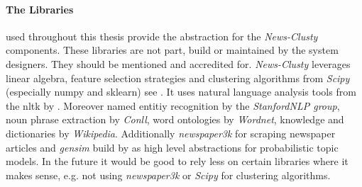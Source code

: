   \paragraph{The Libraries} used throughout this thesis provide the abstraction for the \emph{News-Clusty} components. These libraries are not part, build or maintained by the system designers. They should be mentioned and accredited for. \emph{News-Clusty} leverages linear algebra, feature selection strategies and clustering algorithms from \emph{Scipy} (especially numpy and sklearn) see \cite{ScikitLearn}. It uses natural language analysis tools from the nltk by \cite{NltkPython}. Moreover named entitiy recognition by the \emph{StanfordNLP group}, noun phrase extraction by \emph{Conll}, word ontologies by \emph{Wordnet}, knowledge and dictionaries by \emph{Wikipedia}. Additionally \emph{newspaper3k} for scraping newspaper articles and \emph{gensim} build by \cite{gensim2010} as high level abstractions for probabilistic topic models. In the future it would be good to rely less on certain libraries where it makes sense, e.g. not using \emph{newspaper3k} or \emph{Scipy} for clustering algorithms.



